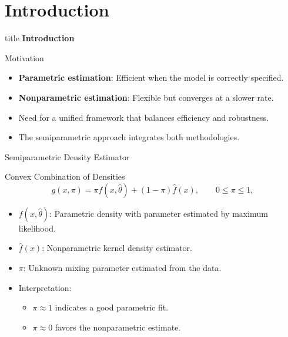 \section{Introduction}
\begin{frame}{\hspace{3cm}}
\centering

\vspace{1.5cm}

\begin{beamercolorbox}[sep=20pt,center,rounded=true,shadow=true]{title}
    {\fontsize{20}{24}\selectfont \textbf{Introduction}}
\end{beamercolorbox}

\vspace{0.8cm}


\vfill

\end{frame}
\begin{frame}{Motivation}
\begin{itemize}
    \item \textbf{Parametric estimation}: Efficient when the model is correctly specified.
    \item \textbf{Nonparametric estimation}: Flexible but converges at a slower rate.
    \item Need for a unified framework that balances efficiency and robustness.
    \item The semiparametric approach integrates both methodologies.
\end{itemize}
\end{frame}

\begin{frame}{Semiparametric Density Estimator}
\begin{block}{Convex Combination of Densities}
\begin{equation}
    g(x,\pi) = \pi f(x,\hat{\theta}) + (1-\pi)\hat{f}(x), \qquad 0 \leq \pi \leq 1,
\end{equation}
\end{block}

\begin{itemize}
    \item $f(x,\hat{\theta})$: Parametric density with parameter estimated by maximum likelihood.
    \item $\hat{f}(x)$: Nonparametric kernel density estimator.
    \item $\pi$: Unknown mixing parameter estimated from the data.
    \item Interpretation:
    \begin{itemize}
        \item $\pi \approx 1$ indicates a good parametric fit.
        \item $\pi \approx 0$ favors the nonparametric estimate.
    \end{itemize}
\end{itemize}
\end{frame}

